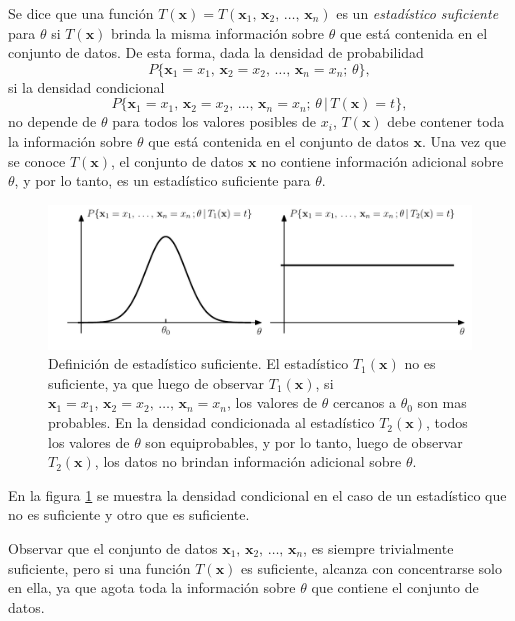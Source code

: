 \documentclass[a4paper]{report}
\newcommand{\x}{\mathbf{x}}
\begin{document}
Se dice que una función \(T(\x)=T(\x_1,\,\x_2,\,\dots,\,\x_n)\) es un \emph{estadístico suficiente} para \(\theta\) si \(T(\x)\) brinda la misma información sobre \(\theta\) que está contenida en el conjunto de datos. De esta forma, dada la densidad de probabilidad
\[
 P\{\x_1=x_1,\,\x_2=x_2,\,\dots,\,\x_n=x_n;\,\theta\},
\]
si la densidad condicional 
\[
 P\{\x_1=x_1,\,\x_2=x_2,\,\dots,\,\x_n=x_n;\,\theta\,|\,T(\x)=t\},
\]
no depende de \(\theta\) para todos los valores posibles de \(x_i\), \(T(\x)\) debe contener toda la información sobre \(\theta\) que está contenida en el conjunto de datos \(\x\). Una vez que se conoce \(T(\x)\), el conjunto de datos \(\x\) no contiene información adicional sobre \(\theta\), y por lo tanto, es un estadístico suficiente para \(\theta\).
\begin{figure}[!htb]
\begin{center}
\includegraphics[width=0.95\columnwidth]{figuras/sufficient_statistic_conditional_pdf.pdf}
\caption{\label{fig:sufficient_statistic_conditional_pdf} Definición de estadístico suficiente. El estadístico \(T_1(\x)\) no es suficiente, ya que luego de observar \(T_1(\x)\), si \(\x_1=x_1,\,\x_2=x_2,\,\dots,\,\x_n=x_n\), los valores de \(\theta\) cercanos a \(\theta_0\) son mas probables. En la densidad condicionada al estadístico \(T_2(\x)\), todos los valores de \(\theta\) son equiprobables, y por lo tanto, luego de observar \(T_2(\x)\), los datos no brindan información adicional sobre \(\theta\).}
\end{center}
\end{figure}
En la figura \ref{fig:sufficient_statistic_conditional_pdf} se muestra la densidad condicional en el caso de un estadístico que no es suficiente y otro que es suficiente.

Observar que el conjunto de datos \(\x_1,\,\x_2,\,\dots,\,\x_n\), es siempre trivialmente suficiente, pero si una función \(T(\x)\) es suficiente, alcanza con concentrarse solo en ella, ya que agota toda la información sobre \(\theta\) que contiene el conjunto de datos.
\end{document}
